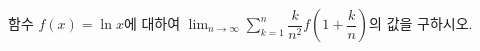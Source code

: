 \hspace*{2mm}\begin{minipage}[t]{\dimexpr\linewidth-2mm\relax}\vspace{0pt}
함수 $f(x)=\ln x$에 대하여 $\displaystyle\lim_{n\to\infty}\sum_{k=1}^{n}\dfrac{k}{n^2}f\left(1+\dfrac{k}{n}\right)$의 값을 구하시오.\end{minipage}
